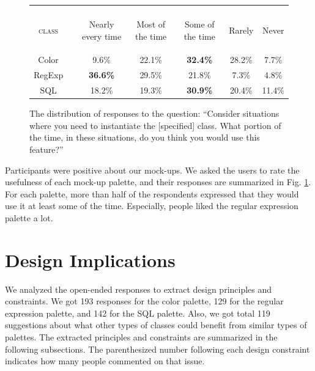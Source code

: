 \documentclass[conference]{IEEEtran}
\begin{document}
\begin{figure}
\begin{tabular}{crccccc}\\\\
\textsc{class}
& 
& \begin{rotate}{20}Nearly every time\end{rotate}
& \begin{rotate}{20}Most of the time\end{rotate}
& \begin{rotate}{20}Some of the time\end{rotate}
& \begin{rotate}{20}Rarely\end{rotate}
& \begin{turn}{20}Never\end{turn}\\
\hline
Color &\vline& 9.6\% & 22.1\% & \textbf{32.4\%} & 28.2\% & 7.7\%\\
RegExp &\vline& \textbf{36.6\%} & 29.5\% & 21.8\% & 7.3\% & 4.8\%\\
SQL & \vline &18.2\% & 19.3\% & \textbf{30.9\%} & 20.4\% & 11.4\%\\
\hline
\end{tabular}
\caption{The distribution of responses to the question: ``Consider situations where you need to instantiate the [specified] class. What portion of the time, in these situations, do you think you would use this feature?''}
\label{frequencies}
\end{figure}

Participants were positive about our mock-ups. We asked the users to rate the usefulness of each mock-up palette, and their responses are summarized in Fig. \ref{frequencies}. For each palette, more than half of the respondents expressed that they would use it at least some of the time. Especially, people liked the regular expression palette a lot.

\section{Design Implications}

We analyzed the open-ended responses to extract design principles and constraints. We got 193 responses for the color palette, 129 for the regular expression palette, and 142 for the SQL palette. Also, we got total 119 suggestions about what other types of classes could benefit from similar types of palettes. The extracted principles and constraints are summarized in the following subsections. The parenthesized number following each design constraint indicates how many people commented on that issue.
\end{document}
